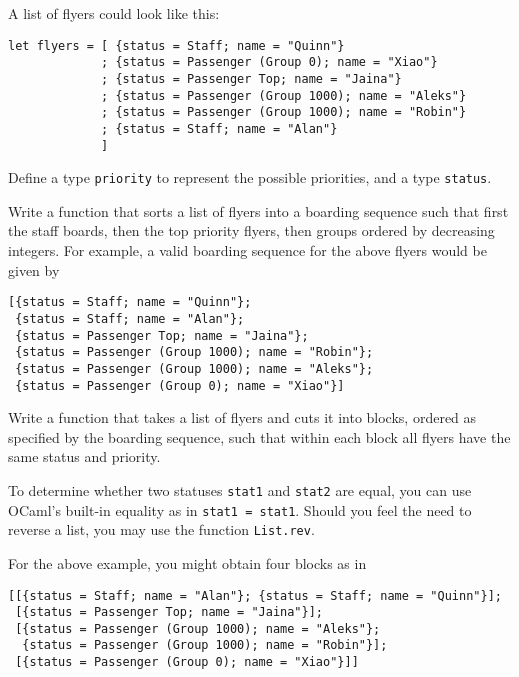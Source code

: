 \documentclass[arhiv]{../izpit}
\begin{document}
A list of flyers could look like this:
\begin{verbatim}
let flyers = [ {status = Staff; name = "Quinn"}
             ; {status = Passenger (Group 0); name = "Xiao"}
             ; {status = Passenger Top; name = "Jaina"}
             ; {status = Passenger (Group 1000); name = "Aleks"}
             ; {status = Passenger (Group 1000); name = "Robin"}
             ; {status = Staff; name = "Alan"}
             ]
\end{verbatim}
%
Define a type \verb|priority| to represent the possible priorities, and a type \verb|status|.

\naloga

Write a function that sorts a list of flyers into a boarding sequence such that first the staff boards, then the top priority flyers, then groups ordered by decreasing integers. For example, a valid boarding sequence for the above flyers would be given by

\begin{verbatim}
[{status = Staff; name = "Quinn"};
 {status = Staff; name = "Alan"};
 {status = Passenger Top; name = "Jaina"};
 {status = Passenger (Group 1000); name = "Robin"};
 {status = Passenger (Group 1000); name = "Aleks"};
 {status = Passenger (Group 0); name = "Xiao"}]
\end{verbatim}

\naloga

Write a function that takes a list of flyers and cuts it into blocks, ordered as specified by the boarding sequence, such that within each block all flyers have the same status and priority.

To determine whether two statuses \verb|stat1| and \verb|stat2| are equal, you can use OCaml's built-in equality as in \verb|stat1 = stat1|. Should you feel the need to reverse a list, you may use the function \verb|List.rev|.

For the above example, you might obtain four blocks as in
%
\begin{verbatim}
[[{status = Staff; name = "Alan"}; {status = Staff; name = "Quinn"}];
 [{status = Passenger Top; name = "Jaina"}];
 [{status = Passenger (Group 1000); name = "Aleks"};
  {status = Passenger (Group 1000); name = "Robin"}];
 [{status = Passenger (Group 0); name = "Xiao"}]]
\end{verbatim}
\end{document}
